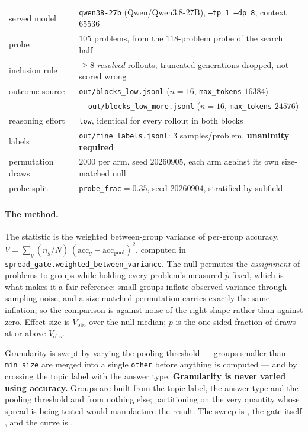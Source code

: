 \begin{center}\small
\begin{tabular}{ll}
\toprule
served model & \texttt{qwen38-27b} (Qwen/Qwen3.8-27B), \texttt{--tp 1 --dp 8}, context $65536$ \\
probe & $105$ problems, from the $118$-problem probe of the search half \\
inclusion rule & $\ge 8$ \emph{resolved} rollouts; truncated generations dropped, not scored wrong \\
outcome source & \texttt{out/blocks\_low.jsonl} ($n{=}16$, \texttt{max\_tokens} $16384$) \\
              & $+$ \texttt{out/blocks\_low\_more.jsonl} ($n{=}16$, \texttt{max\_tokens} $24576$) \\
reasoning effort & \texttt{low}, identical for every rollout in both blocks \\
labels & \texttt{out/fine\_labels.jsonl}: $3$ samples/problem, \textbf{unanimity required} \\
permutation draws & $2000$ per arm, seed $20260905$, each arm against its own size-matched null \\
probe split & \texttt{probe\_frac}$=0.35$, seed $20260904$, stratified by subfield \\
\bottomrule
\end{tabular}
\end{center}

\paragraph{The method.} The statistic is the weighted between-group variance of per-group
accuracy, $V = \sum_g (n_g/N)\,(\mathrm{acc}_g - \mathrm{acc}_{\mathrm{pool}})^2$, computed in
\texttt{spread\_gate.weighted\_between\_variance}. The null permutes the \emph{assignment} of
problems to groups while holding every problem's measured $\hat p$ fixed, which is what makes
it a fair reference: small groups inflate observed variance through sampling noise, and a
size-matched permutation carries exactly the same inflation, so the comparison is against noise
of the right shape rather than against zero. Effect size is $V_{\mathrm{obs}}$ over the null
median; $p$ is the one-sided fraction of draws at or above $V_{\mathrm{obs}}$.

Granularity is swept by varying the pooling threshold --- groups smaller than \texttt{min\_size}
are merged into a single \texttt{other} before anything is computed --- and by crossing the
topic label with the answer type. \textbf{Granularity is never varied using accuracy.} Groups
are built from the topic label, the answer type and the pooling threshold and from nothing
else; partitioning on the very quantity whose spread is being tested would manufacture the
result. The sweep is , the gate itself
, and the curve is .

